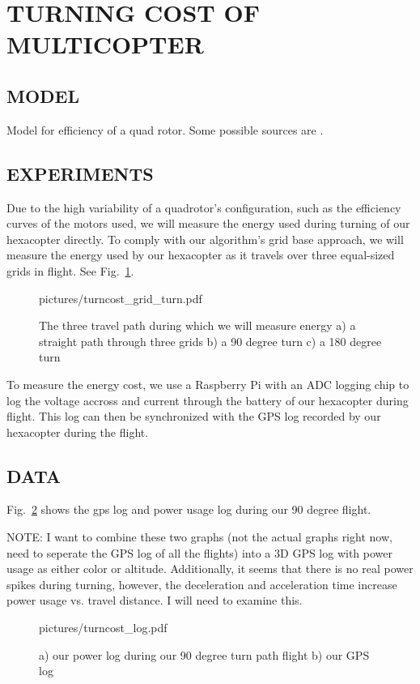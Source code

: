 \section {TURNING COST OF MULTICOPTER}

\subsection{MODEL}

Model for efficiency of a quad rotor. Some possible sources are \cite{driessens2013}.


\subsection{EXPERIMENTS}

Due to the high variability of a quadrotor's configuration, such as the efficiency curves of the motors used, we will measure the energy used during turning of our hexacopter directly.
To comply with our algorithm's grid base approach, we will measure the energy used by our hexacopter as it travels over three equal-sized grids in flight. See Fig.~\ref{fig:gridturn}.

\begin{figure}
	\centering
	\begin{overpic}[width=0.9\columnwidth]{pictures/turncost_grid_turn.pdf}
	\end{overpic}
	\caption{\label{fig:gridturn}
		The three travel path during which we will measure energy
		a) a straight path through three grids
		b) a 90 degree turn
		c) a 180 degree turn
	}
\end{figure}

To measure the energy cost, we use a Raspberry Pi with an ADC logging chip to log the voltage accross and current through the battery of our hexacopter during flight.
This log can then be synchronized with the GPS log recorded by our hexacopter during the flight.

\subsection{DATA}

Fig.~\ref{fig:turnlog_90} shows the gps log and power usage log during our 90 degree flight.

NOTE: I want to combine these two graphs (not the actual graphs right now, need to seperate the GPS log of all the flights) into a 3D GPS log with power usage as either color or altitude.
Additionally, it seems that there is no real power spikes during turning, however, the deceleration and acceleration time increase power usage vs. travel distance.
I will need to examine this. 

\begin{figure}
	\centering
	\begin{overpic}[width=0.9\columnwidth]{pictures/turncost_log.pdf}
	\end{overpic}
	\caption{\label{fig:turnlog_90}
		a) our power log during our 90 degree turn path flight
		b) our GPS log
	}
\end{figure}
